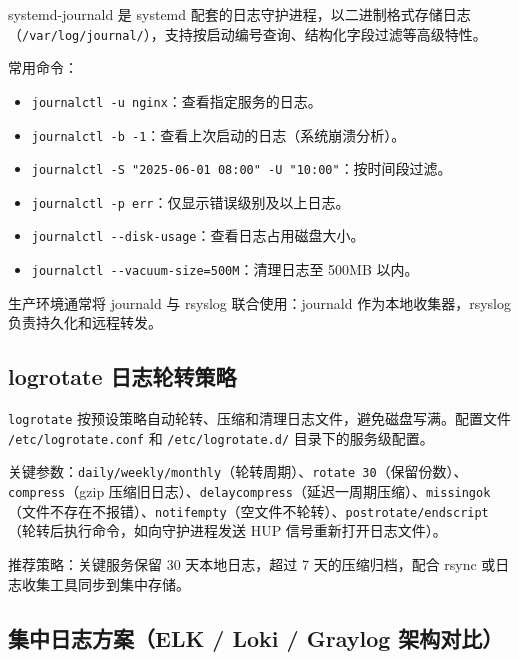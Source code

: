 \documentclass[12pt,UTF8]{ctexbook}
\begin{document}
systemd-journald 是 systemd 配套的日志守护进程，以二进制格式存储日志（\verb|/var/log/journal/|），支持按启动编号查询、结构化字段过滤等高级特性。

常用命令：
\begin{itemize}
	\item \verb|journalctl -u nginx|：查看指定服务的日志。
	\item \verb|journalctl -b -1|：查看上次启动的日志（系统崩溃分析）。
	\item \verb|journalctl -S "2025-06-01 08:00" -U "10:00"|：按时间段过滤。
	\item \verb|journalctl -p err|：仅显示错误级别及以上日志。
	\item \verb|journalctl --disk-usage|：查看日志占用磁盘大小。
	\item \verb|journalctl --vacuum-size=500M|：清理日志至 500MB 以内。
\end{itemize}

生产环境通常将 journald 与 rsyslog 联合使用：journald 作为本地收集器，rsyslog 负责持久化和远程转发。

    \subsection{logrotate 日志轮转策略}

\verb|logrotate| 按预设策略自动轮转、压缩和清理日志文件，避免磁盘写满。配置文件 \verb|/etc/logrotate.conf| 和 \verb|/etc/logrotate.d/| 目录下的服务级配置。

关键参数：\verb|daily/weekly/monthly|（轮转周期）、\verb|rotate 30|（保留份数）、\verb|compress|（gzip 压缩旧日志）、\verb|delaycompress|（延迟一周期压缩）、\verb|missingok|（文件不存在不报错）、\verb|notifempty|（空文件不轮转）、\verb|postrotate/endscript|（轮转后执行命令，如向守护进程发送 HUP 信号重新打开日志文件）。

推荐策略：关键服务保留 30 天本地日志，超过 7 天的压缩归档，配合 rsync 或日志收集工具同步到集中存储。

    \subsection{集中日志方案（ELK / Loki / Graylog 架构对比）}
\end{document}
